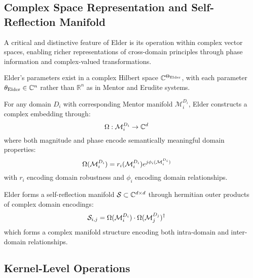 \subsection{Complex Space Representation and Self-Reflection Manifold}

A critical and distinctive feature of Elder is its operation within complex vector spaces, enabling richer representations of cross-domain principles through phase information and complex-valued transformations.

\begin{definition}
Elder's parameters exist in a complex Hilbert space $\mathbb{C}^{\Theta_{\text{Elder}}}$, with each parameter $\theta_{\text{Elder}} \in \mathbb{C}^n$ rather than $\mathbb{R}^n$ as in Mentor and Erudite systems.
\end{definition}

\begin{theorem}
For any domain $D_i$ with corresponding Mentor manifold $\mathcal{M}_i^{D_i}$, Elder constructs a complex embedding through:
\begin{equation}
\Omega: \mathcal{M}_i^{D_i} \rightarrow \mathbb{C}^{d}
\end{equation}
where both magnitude and phase encode semantically meaningful domain properties:
\begin{equation}
\Omega(\mathcal{M}_i^{D_i}) = r_i(\mathcal{M}_i^{D_i})e^{j\phi_i(\mathcal{M}_i^{D_i})}
\end{equation}
with $r_i$ encoding domain robustness and $\phi_i$ encoding domain relationships.
\end{theorem}

\begin{definition}
Elder forms a self-reflection manifold $\mathcal{S} \subset \mathbb{C}^{d \times d}$ through hermitian outer products of complex domain encodings:
\begin{equation}
\mathcal{S}_{i,j} = \Omega(\mathcal{M}_i^{D_i}) \cdot \Omega(\mathcal{M}_j^{D_j})^{\dagger}
\end{equation}
which forms a complex manifold structure encoding both intra-domain and inter-domain relationships.
\end{definition}

\subsection{Kernel-Level Operations}

